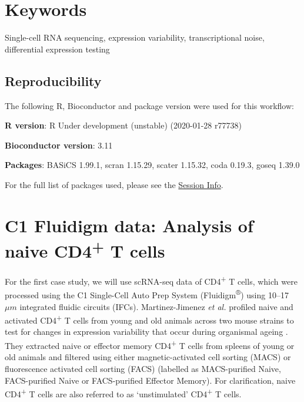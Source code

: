 \documentclass[9pt,a4paper,]{extarticle}
\begin{document}
\section*{Keywords}
Single-cell RNA sequencing, expression variability, transcriptional noise, differential expression testing


\clearpage
\pagestyle{main}

\hypertarget{reproducibility}{%
\subsection{Reproducibility}\label{reproducibility}}

The following R, Bioconductor and package version were used for this workflow:

\textbf{R version}: R Under development (unstable) (2020-01-28 r77738)

\textbf{Bioconductor version}: 3.11

\textbf{Packages}: BASiCS 1.99.1, scran
1.15.29, scater 1.15.32, coda
0.19.3, goseq 1.39.0

For the full list of packages used, please see the \protect\hyperlink{session-info}{Session Info}.

\hypertarget{Tcells}{%
\section{\texorpdfstring{C1 Fluidigm data: Analysis of naive CD4\textsuperscript{+} T cells}{C1 Fluidigm data: Analysis of naive CD4+ T cells}}\label{Tcells}}

For the first case study, we will use scRNA-seq data of CD4\textsuperscript{+} T cells, which
were processed using the C1 Single-Cell Auto Prep System (Fluidigm\textsuperscript{®}) using
10--17 \(\mu{}m\) integrated fluidic circuits (IFCs).
Martinez-Jimenez \emph{et al.} profiled naive and activated CD4\textsuperscript{+} T cells from
young and old animals across two mouse strains to test for changes in
expression variability that occur during organismal ageing
\citep{Martinez-jimenez2017}. They extracted naive or effector memory CD4\textsuperscript{+} T cells
from spleens of young or old animals and filtered using either
magnetic-activated cell sorting (MACS) or fluorescence activated cell sorting
(FACS) (labelled as MACS-purified Naive, FACS-purified Naive or FACS-purified
Effector Memory).
For clarification, naive CD4\textsuperscript{+} T cells are also referred to as `unstimulated'
CD4\textsuperscript{+} T cells.
\end{document}
